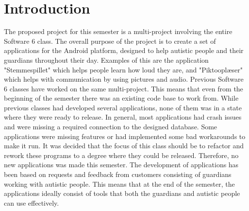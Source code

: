 \chapter{Introduction}\label{chap:introduction}
The proposed project for this semester is a multi-project involving the entire Software 6 class. The overall purpose of the project is to create a set of applications for the Android platform, designed to help autistic people and their guardians throughout their day. Examples of this are the application "Stemmespillet" which helps people learn how loud they are, and "Piktooplæser" which helps with communication by using pictures and audio.
Previous Software 6 classes have worked on the same multi-project. This means that even from the beginning of the semester there was an existing code base to work from. While previous classes had developed several applications, none of them was in a state where they were ready to release. In general, most applications had crash issues and were missing a required connection to the designed database. Some applications were missing features or had implemented some bad workarounds to make it run. It was decided that the focus of this class should be to refactor and rework these programs to a degree where they could be released. Therefore, no new applications was made this semester.
The development of applications has been based on requests and feedback from customers consisting of guardians working with autistic people. This means that at the end of the semester, the applications ideally consist of tools that both the guardians and autistic people can use effectively.